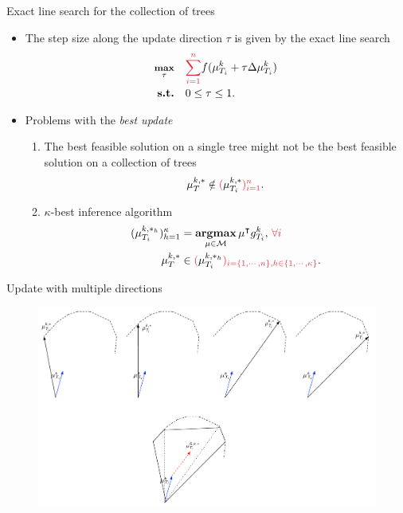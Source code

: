 \documentclass[first=dgreen,second=purple,logo=yellowexc]{aaltoslides}
\begin{document}
\begin{frame}{Exact line search for the collection of trees}
	\begin{itemize}
		\item The step size along the update direction $\tau$ is given by the exact line search
		\begin{align*}\footnotesize
			\underset{\tau}{\maximize} &\quad {\color{aaltored}\sum_{i=1}^n}f(\vmu_{T_i}^k + \tau\Delta\vmu_{T_i}^{k})\\
			\st &\quad 0\le\tau\le1.
		\end{align*}
		\item Problems with the {\em best update}
		\begin{enumerate}\footnotesize
			\item The best feasible solution on a single tree might not be the best feasible solution on a collection of trees
			\begin{align*}
				{\vmu}_{T}^{k,*}\notin{\color{aaltored}(}{\vmu}_{T_i}^{k,*}{\color{aaltored})_{i=1}^n}.
			\end{align*}
			\item $\kappa$-best inference algorithm
			\begin{align*}
				({\vmu}_{T_i}^{k,*_h})_{h=1}^{\kappa} &= \underset{\vmu\in\Mcal}{\argmax}\,\vmu\tp g_{T_i}^k,\,{\color{aaltored}\forall i}\\
				{\vmu}_{T}^{k,*} &\in {\color{aaltored}(}{\vmu}_{T_i}^{k,*_h}{\color{aaltored})_{i=\{1,\cdots,n\},h\in\{1,\cdots,\kappa\}}}.
			\end{align*}
		\end{enumerate}
	\end{itemize}
\end{frame}

\begin{frame}{Update with multiple directions}
	\begin{figure}
		\begin{center}
			\includegraphics[scale=0.3]{multiple_update.pdf}
		\end{center}
	\end{figure}
\end{frame}
\end{document}
